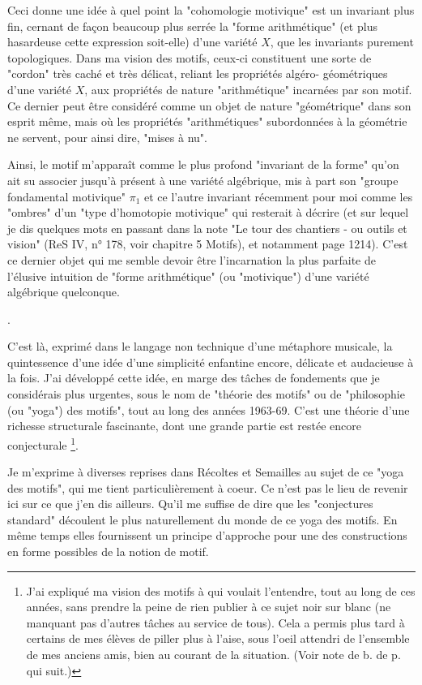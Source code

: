 {Ceci donne une idée à quel point la "cohomologie motivique" est un invariant plus fin, cernant de façon beaucoup plus
serrée la "forme arithmétique" (et plus hasardeuse cette expression soit-elle) d'une variété $X$, que les invariants purement topologiques.
Dans ma vision des motifs, ceux-ci constituent une sorte de "cordon" très caché et très délicat, reliant les propriétés algéro-
géométriques d'une variété $X$, aux propriétés de nature "arithmétique" incarnées par son motif. Ce dernier peut être
considéré comme un objet de nature "géométrique" dans son esprit même, mais où les propriétés "arithmétiques" subordonnées
à la géométrie ne servent, pour ainsi dire, "mises à nu".

Ainsi, le motif m'apparaît comme le plus profond "invariant de la forme" qu'on ait su associer jusqu'à présent à une variété
algébrique, mis à part son "groupe fondamental motivique" $\pi_1$ et ce l'autre invariant récemment pour moi comme les "ombres"
d'un "type d'homotopie motivique" qui resterait à décrire (et sur lequel je dis quelques mots en passant dans la note "Le tour
des chantiers - ou outils et vision" (ReS IV, n° 178, voir chapitre 5 Motifs), et notamment page 1214). C'est ce dernier objet
qui me semble devoir être l'incarnation la plus parfaite de l'élusive intuition de "forme arithmétique" (ou "motivique") d'une
variété algébrique quelconque.}.

C'est là, exprimé dans le langage non technique d'une métaphore musicale, la quintessence d'une idée d'une simplicité enfantine encore, délicate et audacieuse à la fois. J'ai développé cette idée, en marge des tâches de fondements que je considérais plus urgentes, sous le nom de "théorie des motifs" ou de "philosophie (ou "yoga") des motifs", tout au long des années 1963-69. C'est une théorie d'une richesse structurale fascinante, dont une grande partie est restée encore conjecturale \footnote{J'ai expliqué ma vision des motifs à qui voulait l'entendre, tout au long de ces années, sans prendre la peine de rien publier à ce sujet noir sur blanc (ne manquant pas d'autres tâches au service de tous). Cela a permis plus tard à certains de mes élèves de piller plus à l'aise, sous l'oeil attendri de l'ensemble de mes anciens amis, bien au courant de la situation. (Voir note de b. de p. qui suit.)}.

Je m'exprime à diverses reprises dans Récoltes et Semailles au sujet de ce "yoga des motifs", qui me tient particulièrement à coeur. Ce n'est pas le lieu de revenir ici sur ce que j'en dis ailleurs. Qu'il me suffise de dire que les "conjectures standard" découlent le plus naturellement du monde de ce yoga des motifs. En même temps elles fournissent un principe d'approche pour une des constructions en forme possibles de la notion de motif.

